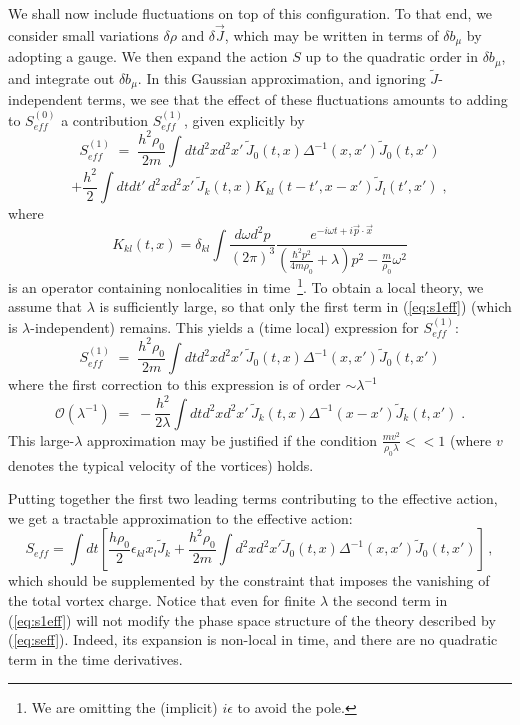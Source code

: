 \documentclass[a4paper,12pt]{article} \tolerance=200
\begin{document}
We shall now include fluctuations on top of this configuration.  To
that end, we consider small variations $\delta\rho$ and $\delta{\vec
J}$, which may be written in terms of $\delta b_\mu$ by adopting a
gauge. We then expand the action $S$ up to the quadratic order in
$\delta b_\mu$, and integrate out $\delta b_\mu$. In this Gaussian
approximation, and ignoring ${\tilde J}$-independent terms, we see
that the effect of these fluctuations amounts to adding to
$S^{(0)}_{eff}$ a contribution $S^{(1)}_{eff}$, given explicitly by
$$
S^{(1)}_{eff}\;=\; \frac{h^2\rho_0}{2 m} \int dt d^2x d^2x'\, {\tilde J}_0(t,x) \Delta^{-1}(x,x')
{\tilde J}_0(t,x')
$$
\begin{equation}\label{eq:s1eff}
+ \frac{h^2}{2} \int dt dt'\, d^2x d^2x'\, {\tilde J}_k (t,x)
K_{kl}(t-t',x-x') {\tilde J}_l (t',x') \;,
\end{equation}
where
\begin{equation}\label{eq:defk}
 K_{kl}(t,x)= \delta_{kl} \int\frac{d\omega d^2p}{(2 \pi)^3}
\frac{e^{-i\omega t + i {\vec p}\cdot{\vec x}}}{(\frac{\hbar^2 p^2}{4
m \rho_0} + \lambda) p^2 - \frac{m}{\rho_0} \omega^2}
\end{equation}
is an operator containing nonlocalities in time~\footnote{We are
omitting the (implicit) $i \epsilon$ to avoid the pole.}. To
obtain a local theory, we assume that $\lambda$ is sufficiently large,
so that only the first term in (\ref{eq:s1eff}) (which is
$\lambda$-independent) remains.  This yields a (time local) expression
for $S^{(1)}_{eff}$:
\begin{equation}\label{eq:s2eff}
S^{(1)}_{eff}\;=\; \frac{h^2\rho_0}{2 m} \int dt d^2x d^2x'\,{\tilde
J}_0(t,x) \Delta^{-1}(x,x') {\tilde J}_0(t,x')
\end{equation}
where the first correction to this expression is of order $\sim
\lambda^{-1}$
\begin{equation}\label{eq:s3eff}
{\mathcal O}(\lambda^{-1})\;=\; - \frac{h^2}{2 \lambda} \int dt d^2x  d^2x'\, {\tilde J}_k (t,x) \Delta^{-1}(x-x')
{\tilde J}_k (t,x') \;.
\end{equation}
This large-$\lambda$ approximation may be justified if the condition
\mbox{$\frac{m v^2}{\rho_0 \lambda} << 1$} (where $v$ denotes the
typical velocity of the vortices) holds.

Putting together the first two leading terms contributing to the
effective action, we get a tractable approximation to the effective
action:
\begin{equation}\label{eq:seff}
S_{eff}=\int dt \left[ \frac{h \rho_0}{2}\epsilon_{kl} x_l {\tilde J}_k +\frac{h^2 \rho_0}{2 m}
\int d^2x d^2x'{\tilde J}_0(t,x) \Delta^{-1}(x,x') {\tilde J}_0(t,x') \right] \,,
\end{equation}
which should be supplemented by the constraint that imposes the
vanishing of the total vortex charge.  Notice that even for finite $\lambda$
the second term in (\ref{eq:s1eff}) will not modify the phase space
structure of the theory described by (\ref{eq:seff}).  Indeed, its
expansion is non-local in time, and there are no quadratic term in the
time derivatives.
\end{document}
